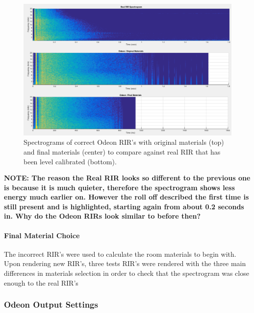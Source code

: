 \documentclass[../../main.tex]{subfiles}
\begin{document}
			\begin{figure}[H]
				\centerline{\includegraphics[scale = 0.4]{Sections/Implementation/Odeon/images/MaterialCompare/NewMaterials/newOdeonComparison.png}}
				\caption{Spectrograms of correct Odeon \ac{RIR}'s with original materials (top) and final materials (center) to compare against real RIR that has been level calibrated (bottom).}
				\label{compareCorrect}
			\end{figure}

			\textbf{NOTE: The reason the Real RIR looks so different to the previous one is because it is much quieter, therefore the spectrogram shows less energy much earlier on. However the roll off described the first time is still present and is highlighted, starting again from about 0.2 seconds in. Why do the Odeon RIRs look similar to before then?}




		\paragraph{Final Material Choice}

			

			The incorrect \ac{RIR}'s were used to calculate the room materials to begin with. Upon rendering new \ac{RIR}'s, three tests \ac{RIR}'s were rendered with the three main differences in materials selection in order to check that the spectrogram was close enough to the real \ac{RIR}'s

		\subsubsection{Odeon Output Settings}
\end{document}
